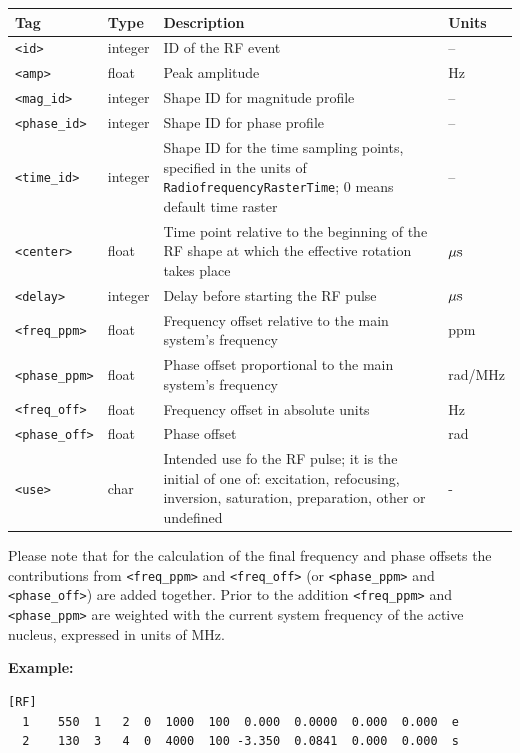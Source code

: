\documentclass{article}
\begin{document}
\begin{tabularx}{\textwidth}{llXl}
\toprule
Tag & Type & Description & Units\\
\midrule
\verb.<id>. & integer & ID of the RF event & -- \\
\verb.<amp>. & float & Peak amplitude & Hz \\
\verb.<mag_id>. & integer & Shape ID for magnitude profile & -- \\
\verb.<phase_id>. & integer & Shape ID for phase profile & --\\
\verb.<time_id>. & integer & Shape ID for the time sampling points, specified in the units of \verb.RadiofrequencyRasterTime.; 0 means default time raster & -- \\
\verb.<center>. & float & Time point relative to the beginning of the RF shape at which the effective rotation takes place & $\rm \mu s$\\
\verb.<delay>. & integer & Delay before starting the RF pulse & $\rm \mu s$\\
\verb.<freq_ppm>. & float & Frequency offset relative to the main system's frequency & ppm \\
\verb.<phase_ppm>. & float & Phase offset proportional to the main system's frequency & rad/MHz \\
\verb.<freq_off>. & float & Frequency offset in absolute units & Hz \\
\verb.<phase_off>. & float & Phase offset & rad \\
\verb.<use>. & char & Intended use fo the RF pulse; it is the initial of one of: 
excitation, refocusing, inversion, saturation,  preparation, other or undefined & - \\
\bottomrule
\end{tabularx}

Please note that for the calculation of the final frequency and phase offsets the contributions from \verb.<freq_ppm>. and \verb.<freq_off>. (or \verb.<phase_ppm>. and \verb.<phase_off>.) are added together. Prior to the addition \verb.<freq_ppm>. and \verb.<phase_ppm>. are weighted with the current system frequency of the active nucleus, expressed in units of MHz.

\begin{minipage}{\textwidth}
\textbf{Example:}
\begin{lstlisting}
[RF]
  1    550  1   2  0  1000  100  0.000  0.0000  0.000  0.000  e
  2    130  3   4  0  4000  100 -3.350  0.0841  0.000  0.000  s
\end{lstlisting}
\end{minipage}
\end{document}
